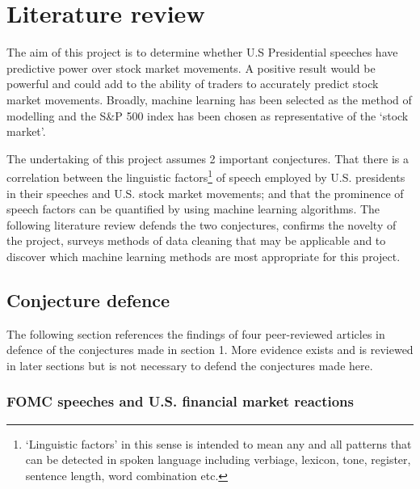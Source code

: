 \documentclass[11pt,preprint, authoryear]{elsarticle}
\numberwithin{equation}{section}
\numberwithin{figure}{section}
\numberwithin{table}{section}
\let\rmarkdownfootnote\footnote%
\def\footnote{\protect\rmarkdownfootnote}
\begin{document}
\hypertarget{literature-review}{%
\section{Literature review}\label{literature-review}}

The aim of this project is to determine whether U.S Presidential
speeches have predictive power over stock market movements. A positive
result would be powerful and could add to the ability of traders to
accurately predict stock market movements. Broadly, machine learning has
been selected as the method of modelling and the S\&P 500 index has been
chosen as representative of the `stock market'.

The undertaking of this project assumes 2 important conjectures. That
there is a correlation between the linguistic factors\footnote{`Linguistic
  factors' in this sense is intended to mean any and all patterns that
  can be detected in spoken language including verbiage, lexicon, tone,
  register, sentence length, word combination etc.} of speech employed
by U.S. presidents in their speeches and U.S. stock market movements;
and that the prominence of speech factors can be quantified by using
machine learning algorithms. The following literature review defends the
two conjectures, confirms the novelty of the project, surveys methods of
data cleaning that may be applicable and to discover which machine
learning methods are most appropriate for this project.

\hypertarget{conjecture-defence}{%
\subsection{Conjecture defence}\label{conjecture-defence}}

The following section references the findings of four peer-reviewed
articles in defence of the conjectures made in section 1. More evidence
exists and is reviewed in later sections but is not necessary to defend
the conjectures made here.

\hypertarget{fomc-speeches-and-u.s.-financial-market-reactions}{%
\subsubsection{FOMC speeches and U.S. financial market
reactions}\label{fomc-speeches-and-u.s.-financial-market-reactions}}
\end{document}
